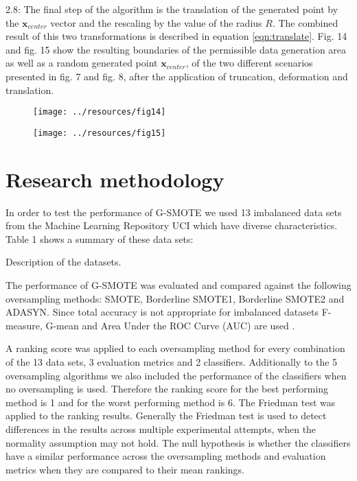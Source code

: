 \documentclass[parskip=full]{scrartcl}
\begin{document}
2.8: The final step of the algorithm is the translation of the generated point by the \( \textbf{x}_{center} \) vector and the rescaling by the value of the radius \( R \). The combined result of this two transformations is described in equation \eqref{eqn:translate}. Fig. 14 and fig. 15 show the resulting boundaries of the permissible data generation area as well as a random generated point \( \textbf{x}_{center} \), of the two different scenarios presented in fig. 7 and fig. 8, after the application of truncation, deformation and translation.

\begin{figure}[H]
	\centering
	\texttt{[image: ../resources/fig14]}
\end{figure}

\begin{figure}[H]
	\centering
	\texttt{[image: ../resources/fig15]}
\end{figure}

\section{Research methodology}

In order to test the performance of G-SMOTE we used 13 imbalanced data sets from the Machine Learning Repository UCI which have diverse characteristics. Table 1 shows a summary of these data sets:

\begin{table}[H]
	\centering
	\caption{Description of the datasets.}
\end{table}

The performance of G-SMOTE was evaluated and compared against the following oversampling methods:  SMOTE, Borderline SMOTE1, Borderline SMOTE2 and ADASYN. Since total accuracy is not appropriate for imbalanced datasets F-measure, G-mean and Area Under the ROC Curve (AUC) are used \cite{He2009}.

A ranking score was applied to each oversampling method for every combination of the 13 data sets, 3 evaluation metrics and 2 classifiers. Additionally to the 5 oversampling algorithms we also included the performance of the classifiers when no oversampling is used. Therefore the ranking score for the best performing method is 1 and for the worst performing method is 6. The Friedman test was applied to the ranking results. Generally the Friedman test is used to detect differences in the results across multiple experimental attempts, when the normality assumption may not hold. The null hypothesis is whether the classifiers have a similar performance across the oversampling methods and evaluation metrics when they are compared to their mean rankings.
\end{document}
